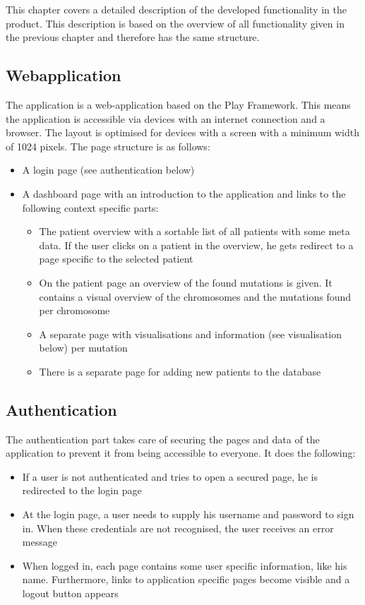 This chapter covers a detailed description of the developed functionality in the product. This description is based  on the overview of all functionality given in the previous chapter and therefore has the same structure.

\subsection{Webapplication}

The application is a web-application based on the Play Framework. This means the application is accessible via devices with an internet connection and a browser. The layout is optimised for devices with a screen with a minimum width of 1024 pixels. The page structure is as follows:

\begin{itemize}
  \item A login page (see authentication below)
  \item A dashboard page with an introduction to the application and links to the following context specific parts:
  \begin{itemize}
     \item The patient overview with a sortable list of all patients with some meta data. If the user clicks on a patient in the overview, he gets redirect to a page specific to the selected patient
     \item On the patient page an overview of the found mutations is given. It contains a visual overview of the chromosomes and the mutations found per chromosome
     \item A separate page with visualisations and information (see visualisation below) per mutation
     \item There is a separate page for adding new patients to the database
  \end{itemize}
\end{itemize}

\subsection{Authentication}

The authentication part takes care of securing the pages and data of the application to prevent it from being accessible to everyone. It does the following:

\begin{itemize}
  \item If a user is not authenticated and tries to open a secured page, he is redirected to the login page
  \item At the login page, a user needs to supply his username and password to sign in. When these credentials are not recognised, the user receives an error message
  \item When logged in, each page contains some user specific information, like his name. Furthermore, links to application specific pages become visible and a logout button appears
\end{itemize}

